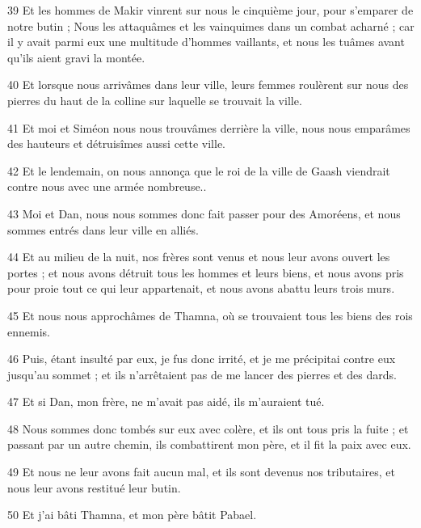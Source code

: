 \par 39 Et les hommes de Makir vinrent sur nous le cinquième jour, pour s'emparer de notre butin ; Nous les attaquâmes et les vainquimes dans un combat acharné ; car il y avait parmi eux une multitude d'hommes vaillants, et nous les tuâmes avant qu'ils aient gravi la montée.

\par 40 Et lorsque nous arrivâmes dans leur ville, leurs femmes roulèrent sur nous des pierres du haut de la colline sur laquelle se trouvait la ville.

\par 41 Et moi et Siméon nous nous trouvâmes derrière la ville, nous nous emparâmes des hauteurs et détruisîmes aussi cette ville.

\par 42 Et le lendemain, on nous annonça que le roi de la ville de Gaash viendrait contre nous avec une armée nombreuse..

\par 43 Moi et Dan, nous nous sommes donc fait passer pour des Amoréens, et nous sommes entrés dans leur ville en alliés.

\par 44 Et au milieu de la nuit, nos frères sont venus et nous leur avons ouvert les portes ; et nous avons détruit tous les hommes et leurs biens, et nous avons pris pour proie tout ce qui leur appartenait, et nous avons abattu leurs trois murs.

\par 45 Et nous nous approchâmes de Thamna, où se trouvaient tous les biens des rois ennemis.

\par 46 Puis, étant insulté par eux, je fus donc irrité, et je me précipitai contre eux jusqu'au sommet ; et ils n'arrêtaient pas de me lancer des pierres et des dards.

\par 47 Et si Dan, mon frère, ne m'avait pas aidé, ils m'auraient tué.

\par 48 Nous sommes donc tombés sur eux avec colère, et ils ont tous pris la fuite ; et passant par un autre chemin, ils combattirent mon père, et il fit la paix avec eux.

\par 49 Et nous ne leur avons fait aucun mal, et ils sont devenus nos tributaires, et nous leur avons restitué leur butin.

\par 50 Et j'ai bâti Thamna, et mon père bâtit Pabael.

